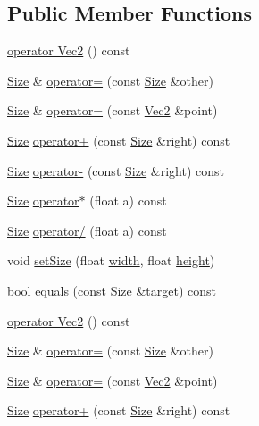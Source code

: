\subsection*{Public Member Functions}
\begin{DoxyCompactItemize}
\item 
\hyperlink{classSize_a3016d7e4f7214c4a190511c1b7ea30a4}{operator Vec2} () const
\item 
\hyperlink{classSize}{Size} \& \hyperlink{classSize_ad0e6ddb33be2355f860448748d66c04b}{operator=} (const \hyperlink{classSize}{Size} \&other)
\item 
\hyperlink{classSize}{Size} \& \hyperlink{classSize_a56ca561ea815bad82fceecc659f1e399}{operator=} (const \hyperlink{classVec2}{Vec2} \&point)
\item 
\hyperlink{classSize}{Size} \hyperlink{classSize_a5ea246140e8dcee5af256b751eb58bd0}{operator+} (const \hyperlink{classSize}{Size} \&right) const
\item 
\hyperlink{classSize}{Size} \hyperlink{classSize_a591e1fd7d3b14db4da48a836437becd9}{operator-\/} (const \hyperlink{classSize}{Size} \&right) const
\item 
\hyperlink{classSize}{Size} \hyperlink{classSize_aa927f929575591818d750e79453601c3}{operator$\ast$} (float a) const
\item 
\hyperlink{classSize}{Size} \hyperlink{classSize_a38a29b34d6e233b29743defc4a69319a}{operator/} (float a) const
\item 
void \hyperlink{classSize_a3aefde34596edaed033ec39a61891fca}{set\+Size} (float \hyperlink{classSize_af0be19024ddd79e7843492b3760c21f0}{width}, float \hyperlink{classSize_a880fa21eaad5a5a0fe439d440776fd05}{height})
\item 
bool \hyperlink{classSize_ad972167b9f67a3feac16fd7f0aeffbef}{equals} (const \hyperlink{classSize}{Size} \&target) const
\item 
\hyperlink{classSize_a3016d7e4f7214c4a190511c1b7ea30a4}{operator Vec2} () const
\item 
\hyperlink{classSize}{Size} \& \hyperlink{classSize_a27a0969f5f851a45da8ce08e14374d3f}{operator=} (const \hyperlink{classSize}{Size} \&other)
\item 
\hyperlink{classSize}{Size} \& \hyperlink{classSize_aaf32198481cd7255dd15f57da766da86}{operator=} (const \hyperlink{classVec2}{Vec2} \&point)
\item 
\hyperlink{classSize}{Size} \hyperlink{classSize_a5ea246140e8dcee5af256b751eb58bd0}{operator+} (const \hyperlink{classSize}{Size} \&right) const

\end{DoxyCompactItemize}
